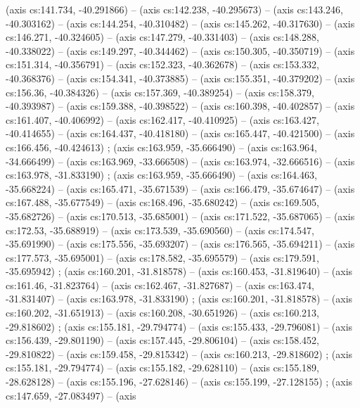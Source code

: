   (axis cs:141.734, -40.291866) -- (axis cs:142.238, -40.295673) -- (axis
  cs:143.246, -40.303162) -- (axis cs:144.254, -40.310482) -- (axis
  cs:145.262, -40.317630) -- (axis cs:146.271, -40.324605) -- (axis
  cs:147.279, -40.331403) -- (axis cs:148.288, -40.338022) -- (axis
  cs:149.297, -40.344462) -- (axis cs:150.305, -40.350719) -- (axis
  cs:151.314, -40.356791) -- (axis cs:152.323, -40.362678) -- (axis
  cs:153.332, -40.368376) -- (axis cs:154.341, -40.373885) -- (axis
  cs:155.351, -40.379202) -- (axis cs:156.36, -40.384326) -- (axis cs:157.369,
  -40.389254) -- (axis cs:158.379, -40.393987) -- (axis cs:159.388,
  -40.398522) -- (axis cs:160.398, -40.402857) -- (axis cs:161.407,
  -40.406992) -- (axis cs:162.417, -40.410925) -- (axis cs:163.427,
  -40.414655) -- (axis cs:164.437, -40.418180) -- (axis cs:165.447,
  -40.421500) -- (axis cs:166.456, -40.424613) ; 
  (axis cs:163.959, -35.666490) -- (axis cs:163.964, -34.666499) -- (axis
  cs:163.969, -33.666508) -- (axis cs:163.974, -32.666516) -- (axis
  cs:163.978, -31.833190) ;  (axis cs:163.959,
  -35.666490) -- (axis cs:164.463, -35.668224) -- (axis cs:165.471,
  -35.671539) -- (axis cs:166.479, -35.674647) -- (axis cs:167.488,
  -35.677549) -- (axis cs:168.496, -35.680242) -- (axis cs:169.505,
  -35.682726) -- (axis cs:170.513, -35.685001) -- (axis cs:171.522,
  -35.687065) -- (axis cs:172.53, -35.688919) -- (axis cs:173.539, -35.690560)
  -- (axis cs:174.547, -35.691990) -- (axis cs:175.556, -35.693207) -- (axis
  cs:176.565, -35.694211) -- (axis cs:177.573, -35.695001) -- (axis
  cs:178.582, -35.695579) -- (axis cs:179.591, -35.695942)
  ;  (axis cs:160.201, -31.818578) -- (axis
  cs:160.453, -31.819640) -- (axis cs:161.46, -31.823764) -- (axis cs:162.467,
  -31.827687) -- (axis cs:163.474, -31.831407) -- (axis cs:163.978,
  -31.833190) ;  (axis cs:160.201, -31.818578) --
  (axis cs:160.202, -31.651913) -- (axis cs:160.208, -30.651926) -- (axis
  cs:160.213, -29.818602) ;  (axis cs:155.181,
  -29.794774) -- (axis cs:155.433, -29.796081) -- (axis cs:156.439,
  -29.801190) -- (axis cs:157.445, -29.806104) -- (axis cs:158.452,
  -29.810822) -- (axis cs:159.458, -29.815342) -- (axis cs:160.213,
  -29.818602) ;  (axis cs:155.181, -29.794774) --
  (axis cs:155.182, -29.628110) -- (axis cs:155.189, -28.628128) -- (axis
  cs:155.196, -27.628146) -- (axis cs:155.199, -27.128155)
  ;  (axis cs:147.659, -27.083497) -- (axis
